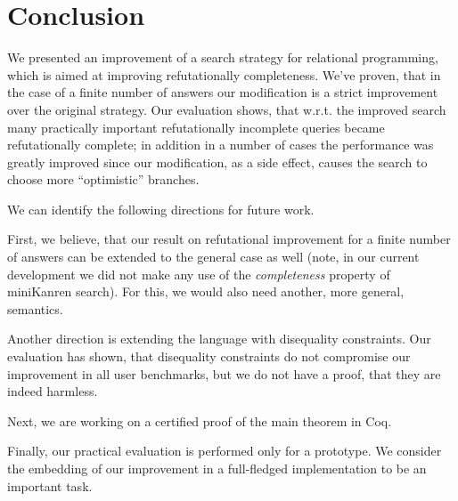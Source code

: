 \section{Conclusion}
\label{conclusion}

We presented an improvement of a search strategy for relational programming, which is aimed at
improving refutationally completeness. We've proven, that in the case of a finite number of 
answers our modification is a strict improvement over the original strategy. Our evaluation 
shows, that w.r.t. the improved search many practically important refutationally incomplete 
queries became refutationally complete; in addition in a number of cases the performance was greatly 
improved since our modification, as a side effect, causes the search to choose more 
``optimistic'' branches. 

We can identify the following directions for future work. 

First, we believe, that our result on refutational improvement for a finite number of answers 
can be extended to the general case as well (note, in our current development we did not make 
any use of the \emph{completeness} property of miniKanren search). For this, we would also need 
another, more general, semantics. 

Another direction is extending the language with disequality constraints. Our evaluation has 
shown, that disequality constraints do not compromise our improvement in all user benchmarks, 
but we do not have a proof, that they are indeed harmless.

Next, we are working on a certified proof of the main theorem in Coq.

Finally, our practical evaluation is performed only for a prototype. 
We consider the embedding of our improvement in a full-fledged implementation to be
an important task.